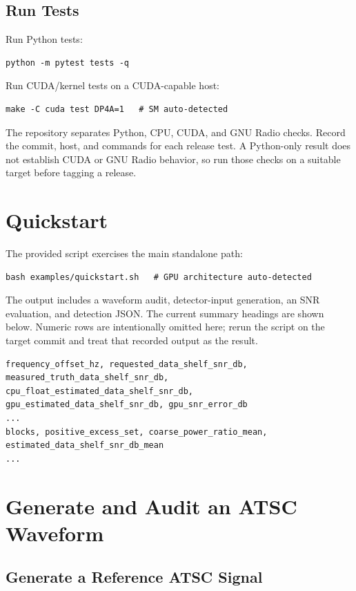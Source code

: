 \documentclass[10pt,letterpaper]{article}
\begin{document}
\subsection{Run Tests}

Run Python tests:
\begin{lstlisting}[style=shell]
python -m pytest tests -q
\end{lstlisting}
Run CUDA/kernel tests on a CUDA-capable host:
\begin{lstlisting}[style=shell]
make -C cuda test DP4A=1   # SM auto-detected
\end{lstlisting}
The repository separates Python, CPU, CUDA, and GNU Radio checks. Record the commit, host, and commands for each release test. A Python-only result does not establish CUDA or GNU Radio behavior, so run those checks on a suitable target before tagging a release.

\section{Quickstart}

The provided script exercises the main standalone path:
\begin{lstlisting}[style=shell]
bash examples/quickstart.sh   # GPU architecture auto-detected
\end{lstlisting}
The output includes a waveform audit, detector-input generation, an SNR evaluation, and detection JSON. The current summary headings are shown below. Numeric rows are intentionally omitted here; rerun the script on the target commit and treat that recorded output as the result.
\begin{lstlisting}[style=shell]
frequency_offset_hz, requested_data_shelf_snr_db,
measured_truth_data_shelf_snr_db, cpu_float_estimated_data_shelf_snr_db,
gpu_estimated_data_shelf_snr_db, gpu_snr_error_db
...
blocks, positive_excess_set, coarse_power_ratio_mean,
estimated_data_shelf_snr_db_mean
...
\end{lstlisting}

\section{Generate and Audit an ATSC Waveform}

\subsection{Generate a Reference ATSC Signal}
\end{document}
